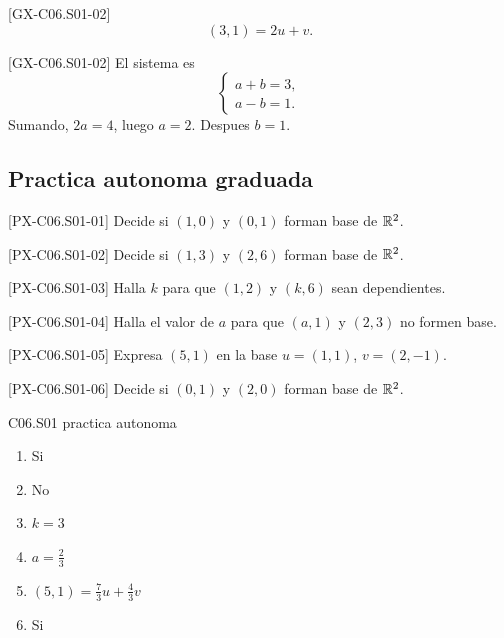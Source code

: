 \begin{shortanswer}{[GX-C06.S01-02]}
\[
(3,1)=2u+v.
\]
\end{shortanswer}

\begin{fullsolution}{[GX-C06.S01-02]}
El sistema es
\[
\begin{cases}
a+b=3,\\
a-b=1.
\end{cases}
\]
Sumando, \(2a=4\), luego \(a=2\). Despues \(b=1\).
\end{fullsolution}

\subsection*{Practica autonoma graduada}
\begin{exercise}{[PX-C06.S01-01] Decide si \((1,0)\) y \((0,1)\) forman base de \(\mathbb{R}^2\).}
\end{exercise}
\begin{exercise}{[PX-C06.S01-02] Decide si \((1,3)\) y \((2,6)\) forman base de \(\mathbb{R}^2\).}
\end{exercise}
\begin{exercise}{[PX-C06.S01-03] Halla \(k\) para que \((1,2)\) y \((k,6)\) sean dependientes.}
\end{exercise}
\begin{exercise}{[PX-C06.S01-04] Halla el valor de \(a\) para que \((a,1)\) y \((2,3)\) no formen base.}
\end{exercise}
\begin{exercise}{[PX-C06.S01-05] Expresa \((5,1)\) en la base \(u=(1,1)\), \(v=(2,-1)\).}
\end{exercise}
\begin{exercise}{[PX-C06.S01-06] Decide si \((0,1)\) y \((2,0)\) forman base de \(\mathbb{R}^2\).}
\end{exercise}

\begin{shortanswer}{C06.S01 practica autonoma}
\begin{enumerate}[label=\textbf{PX-C06.S01-\arabic*:}, leftmargin=*]
  \item Si
  \item No
  \item \(k=3\)
  \item \(a=\frac{2}{3}\)
  \item \((5,1)=\frac{7}{3}u+\frac{4}{3}v\)
  \item Si
\end{enumerate}
\end{shortanswer}

